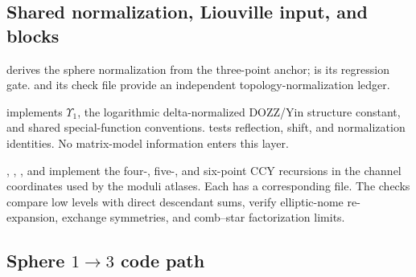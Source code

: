 \documentclass[11pt]{article}
\begin{document}
\subsection{Shared normalization, Liouville input, and blocks}

\begin{description}[style=nextline,leftmargin=2.8cm]
  \item[Normalization]
   derives the sphere normalization
  from the three-point anchor; 
  is its regression gate.  
  and its check file provide an independent topology-normalization ledger.

  \item[Liouville data]
   implements $\Upsilon_1$, the logarithmic
  delta-normalized DOZZ/Yin structure constant, and shared special-function
  conventions.   tests reflection,
  shift, and normalization identities.  No matrix-model information enters
  this layer.

  \item[Virasoro blocks]
  , ,
  , and
   implement the four-, five-, and
  six-point CCY recursions in the channel coordinates used by the moduli
  atlases.  Each has a corresponding  file.  The checks
  compare low levels with direct descendant sums, verify elliptic-nome
  re-expansion, exchange symmetries, and comb--star factorization limits.
\end{description}

\subsection{Sphere \texorpdfstring{$1\to3$}{1 to 3} code path}
\end{document}
